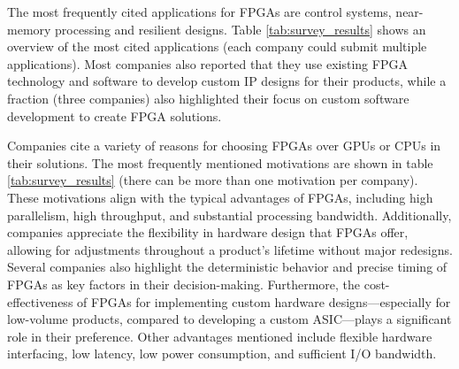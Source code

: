 \begin{table}[ht]
\caption{Most cited applications where FPGAs are used, and reasons for preferring a design involving FPGAs}
\label{tab:survey_results}
\end{table}

The most frequently cited applications for FPGAs are control systems, near-memory processing and resilient designs. Table \ref{tab:survey_results} shows an overview of the most cited applications (each company could submit multiple applications). Most companies also reported that they use existing FPGA technology and software to develop custom IP designs for their products, while a fraction (three companies) also highlighted their focus on custom software development to create FPGA solutions.

Companies cite a variety of reasons for choosing FPGAs over GPUs or CPUs in their solutions. The most frequently mentioned motivations are shown in table \ref{tab:survey_results} (there can be more than one motivation per company). These motivations align with the typical advantages of FPGAs, including high parallelism, high throughput, and substantial processing bandwidth. Additionally, companies appreciate the flexibility in hardware design that FPGAs offer, allowing for adjustments throughout a product's lifetime without major redesigns. Several companies also highlight the deterministic behavior and precise timing of FPGAs as key factors in their decision-making. Furthermore, the cost-effectiveness of FPGAs for implementing custom hardware designs—especially for low-volume products, compared to developing a custom ASIC—plays a significant role in their preference. Other advantages mentioned include flexible hardware interfacing, low latency, low power consumption, and sufficient I/O bandwidth.



